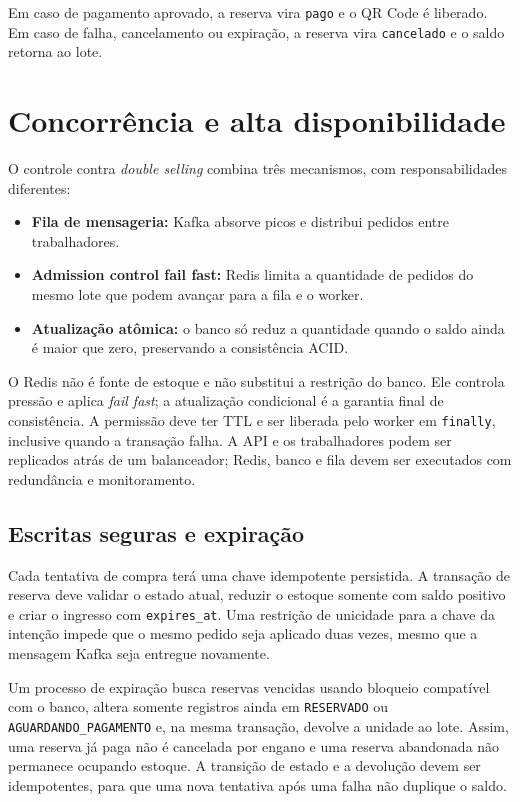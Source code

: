 \documentclass[12pt,a4paper]{article}
\begin{document}
Em caso de pagamento aprovado, a reserva vira \texttt{pago} e o QR Code \'e liberado. Em caso de falha, cancelamento ou expira\c{c}\~ao, a reserva vira \texttt{cancelado} e o saldo retorna ao lote.

\section{Concorr\^encia e alta disponibilidade}

O controle contra \textit{double selling} combina tr\^es mecanismos, com responsabilidades diferentes:

\begin{itemize}
  \item \textbf{Fila de mensageria:} Kafka absorve picos e distribui pedidos entre trabalhadores.
  \item \textbf{Admission control fail fast:} Redis limita a quantidade de pedidos do mesmo lote que podem avan\c{c}ar para a fila e o worker.
  \item \textbf{Atualiza\c{c}\~ao at\^omica:} o banco s\'o reduz a quantidade quando o saldo ainda \'e maior que zero, preservando a consist\^encia ACID.
\end{itemize}

O Redis n\~ao \'e fonte de estoque e n\~ao substitui a restri\c{c}\~ao do banco. Ele controla press\~ao e aplica \textit{fail fast}; a atualiza\c{c}\~ao condicional \'e a garantia final de consist\^encia. A permiss\~ao deve ter TTL e ser liberada pelo worker em \texttt{finally}, inclusive quando a transa\c{c}\~ao falha. A API e os trabalhadores podem ser replicados atr\'as de um balanceador; Redis, banco e fila devem ser executados com redund\^ancia e monitoramento.

\subsection{Escritas seguras e expira\c{c}\~ao}

Cada tentativa de compra ter\'a uma chave idempotente persistida. A transa\c{c}\~ao de reserva deve validar o estado atual, reduzir o estoque somente com saldo positivo e criar o ingresso com \texttt{expires\_at}. Uma restri\c{c}\~ao de unicidade para a chave da inten\c{c}\~ao impede que o mesmo pedido seja aplicado duas vezes, mesmo que a mensagem Kafka seja entregue novamente.

Um processo de expira\c{c}\~ao busca reservas vencidas usando bloqueio compat\'ivel com o banco, altera somente registros ainda em \texttt{RESERVADO} ou \texttt{AGUARDANDO\_PAGAMENTO} e, na mesma transa\c{c}\~ao, devolve a unidade ao lote. Assim, uma reserva j\'a paga n\~ao \'e cancelada por engano e uma reserva abandonada n\~ao permanece ocupando estoque. A transi\c{c}\~ao de estado e a devolu\c{c}\~ao devem ser idempotentes, para que uma nova tentativa ap\'os uma falha n\~ao duplique o saldo.
\end{document}
